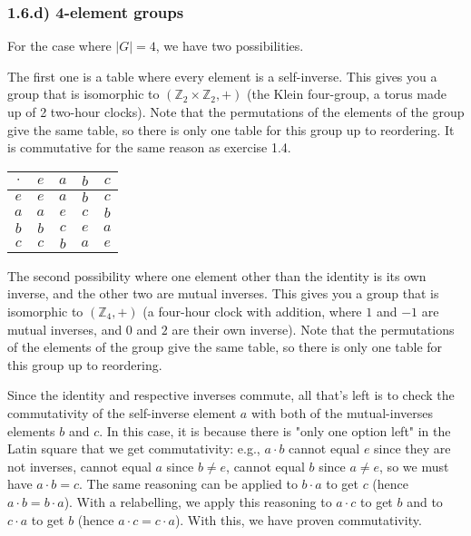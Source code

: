 \subsubsection*{1.6.d) 4-element groups}

For the case where $|G| = 4$, we have two possibilities.

The first one is a table where every element is a self-inverse. This gives you a group that is isomorphic to $(\mathbb{Z}_2 \times \mathbb{Z}_2, +)$ (the Klein four-group, a torus made up of 2 two-hour clocks). Note that the permutations of the elements of the group give the same table, so there is only one table for this group up to reordering. It is commutative for the same reason as exercise 1.4.

\begin{tabular}{|c||c|c|c|c|}
\hline
$\cdot$ & $e$ & $a$ & $b$ & $c$ \\ \hline \hline
$e    $ & $e$ & $a$ & $b$ & $c$ \\ \hline
$a    $ & $a$ & $e$ & $c$ & $b$ \\ \hline
$b    $ & $b$ & $c$ & $e$ & $a$ \\ \hline
$c    $ & $c$ & $b$ & $a$ & $e$ \\ \hline
\end{tabular}

The second possibility where one element other than the identity is its own inverse, and the other two are mutual inverses. This gives you a group that is isomorphic to $(\mathbb{Z}_4, +)$ (a four-hour clock with addition, where $1$ and $-1$ are mutual inverses, and $0$ and $2$ are their own inverse). Note that the permutations of the elements of the group give the same table, so there is only one table for this group up to reordering.

Since the identity and respective inverses commute, all that's left is to check the commutativity of the self-inverse element $a$ with both of the mutual-inverses elements $b$ and $c$. In this case, it is because there is "only one option left" in the Latin square that we get commutativity: e.g., $a \cdot b$ cannot equal $e$ since they are not inverses, cannot equal $a$ since $b \ne e$, cannot equal $b$ since $a \ne e$, so we must have $a \cdot b = c$. The same reasoning can be applied to $b \cdot a$ to get $c$ (hence $a \cdot b = b \cdot a$). With a relabelling, we apply this reasoning to $a \cdot c$ to get $b$ and to $c \cdot a$ to get $b$ (hence $a \cdot c = c \cdot a$). With this, we have proven commutativity.

